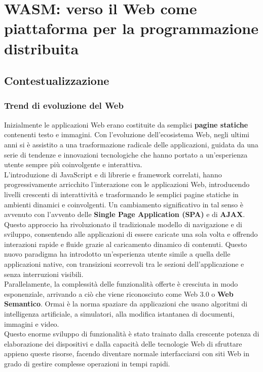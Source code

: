 \chapter{WASM: verso il Web come piattaforma per la programmazione distribuita}
\label{chap:1}

\section{Contestualizzazione}
\label{sec:Contestualizzazione}

\subsection{Trend di evoluzione del Web}
Inizialmente le applicazioni Web erano costituite da semplici \textbf{pagine statiche} contenenti testo e immagini.
Con l'evoluzione dell'ecosistema Web, negli ultimi anni si è assistito a una trasformazione radicale delle applicazioni, guidata da una serie di tendenze e innovazioni tecnologiche che hanno portato a un'esperienza utente sempre più coinvolgente e interattiva.
\\L'introduzione di JavaScript e di librerie e framework correlati, hanno progressivamente arricchito l'interazione con le applicazioni Web, introducendo livelli crescenti di interattività e trasformando le semplici pagine statiche in ambienti dinamici e coinvolgenti. 
Un cambiamento significativo in tal senso è avvenuto con l'avvento delle \textbf{Single Page Application (SPA)} e di \textbf{AJAX}.
Questo approccio ha rivoluzionato il tradizionale modello di navigazione e di sviluppo, consentendo alle applicazioni di essere caricate una sola volta e offrendo interazioni rapide e fluide grazie al caricamento dinamico di contenuti. Questo nuovo paradigma ha introdotto un'esperienza utente simile a quella delle applicazioni native, con transizioni scorrevoli tra le sezioni dell'applicazione e senza interruzioni visibili.
\\Parallelamente, la complessità delle funzionalità offerte è cresciuta in modo esponenziale, arrivando a ciò che viene riconosciuto come Web 3.0 o \textbf{Web Semantico}. Ormai è la norma spaziare da applicazioni che usano algoritmi di intelligenza artificiale, a simulatori, alla modifica istantanea di documenti, immagini e video.
\\Questo enorme sviluppo di funzionalità è stato trainato dalla crescente potenza di elaborazione dei dispositivi e dalla capacità delle tecnologie Web di sfruttare appieno queste risorse, facendo diventare normale interfacciarsi con siti Web in grado di gestire complesse operazioni in tempi rapidi.
